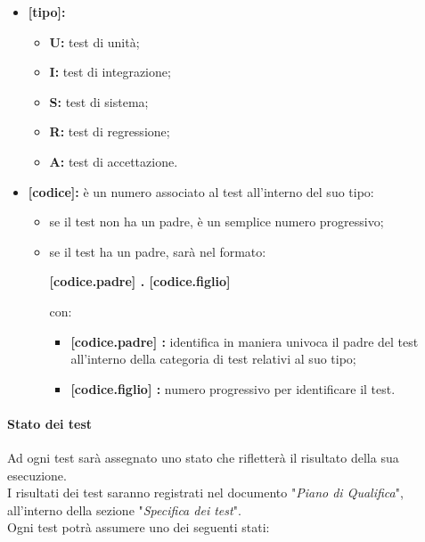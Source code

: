 \begin{itemize}
    \item \textbf{[tipo]:} 
        \begin{itemize}
            \item \textbf{U:} 
                test di unità;
            \item \textbf{I:} 
                test di integrazione;
            \item \textbf{S:} 
                test di sistema;
            \item \textbf{R:} 
                test di regressione;
            \item\textbf{A:} 
                test di accettazione.
        \end{itemize}
    \item \textbf{[codice]:} 
        è un numero associato al test all'interno del suo tipo:
        \begin{itemize}
            \item 
                se il test non ha un padre, è un semplice numero progressivo;
            \item 
                se il test ha un padre, sarà nel formato:
                \begin{center}
                    \textbf{[codice.padre] . [codice.figlio]}
                \end{center}
                con:
                \begin{itemize}
                    \item \textbf{[codice.padre] :} 
                        identifica in maniera univoca il padre del test all'interno della categoria di test relativi al suo tipo;
                    \item \textbf{[codice.figlio] :} 
                        numero progressivo per identificare il test.
                \end{itemize}
        \end{itemize}
\end{itemize}

\paragraph{Stato dei test}
Ad ogni test sarà assegnato uno stato che rifletterà il risultato della sua esecuzione. \\
I risultati dei test saranno registrati nel documento "\textit{Piano di Qualifica}", all'interno della sezione "\textit{Specifica dei test}". \\
Ogni test potrà assumere uno dei seguenti stati:

